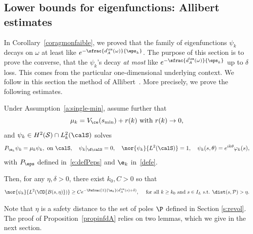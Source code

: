 \subsection{Lower bounds for eigenfunctions: Allibert estimates}
\label{sectlower}
In Corollary~\ref{coragmonfaible}, we proved that the family of eigenfunctions $\psi_k$ decays on $\omega$ at least like $e^{-\sfrac{d_A^{\ce}(\omega)}{\eps_k}}$.
The purpose of this section is to prove the converse, \ie that the $\psi_k$'s decay {\em at most} like $e^{-\sfrac{d_A^{\ce}(\omega)}{\eps_k}}$ up to $\delta$ loss.
This comes from the particular one-dimensional underlying context.
We follow in this section the method of Allibert~\cite{Allibert:98}.
More precisely, we prove the following estimates.
\begin{proposition}
\label{propinfdA}
Under Assumption~\ref{a:single-min}, assume further that
\begin{equation}
\label{rappelmuinf}\mu_k = V_\ce(s_{\min}) +r(k)\textnormal{ with }r(k)\to 0,
\end{equation}
and $\psi_k \in H^2 (\mathcal{S})\cap L^2_k(\calS)$ solves
\[
P_{\e_k}\psi_k=\mu_k \psi_k, \text{ on } \calS, \quad \psi_k|_{\d\calS} = 0,\quad \nor{\psi_k}{L^2(\calS)}=1, \quad \psi_k(s, \theta) = e^{ik \theta}\varphi_k(s),
\]
with $P_\eps$ defined in~\eqref{e:defPeps} and $\e_k$ in~\eqref{defe}.

Then, for any $\eta,\delta>0$, there exist $k_0,C>0$ so that
\[
\nor{\psi_k}{L^2(\CO{B(s,\eta)})}\geq C e^{-\Psfrac{1}{\e_k}(d_A^{\ce}(s)+\delta)}, \quad \text{ for all } k\geq k_0\text{ and }s \in I_L \text{ s.t. }\dist(s,\mathcal{P} )>\eta.
\]
\end{proposition}
Note that $\eta$ is a safety distance to the set of poles $\P$ defined in Section \ref{s:revol}.
The proof of Proposition~\ref{propinfdA} relies on two lemmas, which we give in the next section.

